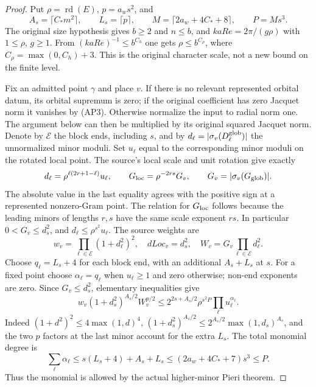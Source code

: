 \begin{proof}
Put \(\rho=\operatorname{rd}(E)\), \(p=a_ws^2\), and
\[
       A_s=\lceil C_*m^2\rceil,\qquad L_s=\lceil p\rceil,
       \qquad M=\lceil 2a_w+4C_*+8\rceil,\qquad P=M s^3 .
\]
The original size hypothesis gives \(b\ge2\) and
\(n\le b\), and \(kaRe=2\pi/(g\rho)\) with
\(1\le\rho\), \(g\ge1\). From \((kaRe)^{-1}\le b^{C_h}\)
one gets
\(\rho\le b^{C_\rho}\), where
\(C_\rho=\max(0,C_h)+3\).
This is the original character scale, not a new
bound on the finite level.

Fix an admitted point \(\gamma\) and place \(v\).
If there is no relevant represented orbital datum,
its orbital supremum is zero; if the original
coefficient has zero Jacquet norm it vanishes by
(AP3). Otherwise normalize the input to radial
norm one. The argument below can then be multiplied
by its original squared Jacquet norm. Denote by
\(\mathcal E\) the block ends, including \(s\), and by
\(d_\ell=|\sigma_v(D_\ell^{\rm glob})|\) the
unnormalized minor moduli. Set \(u_\ell\) equal to
the corresponding minor moduli on the rotated
local point. The source's local scale and unit
rotation give exactly
\[
 d_\ell=\rho^{\ell(2r+1-\ell)}u_\ell,\qquad
 G_{\rm loc}=\rho^{-2rs}G_v,\qquad
 G_v=|\sigma_v(G_{\rm glob})| .
\]
The absolute value in the last equality agrees
with the positive sign at a represented nonzero-Gram
point. The relation for \(G_{\rm loc}\) follows
because the leading minors of lengths \(r,s\)
have the same scale exponent \(rs\).
In particular \(0<G_v\le d_s^2\), and
\(d_\ell\le\rho^{s^2}u_\ell\).
The source weights are
\[
 w_v=\prod_{\ell\in\mathcal E}(1+d_\ell^2)^2,\quad
 dLoc_v=d_s^2,\quad W_v=G_v\prod_{\ell\in\mathcal E}d_\ell^2 .
\]
Choose \(q_\ell=L_s+4\) for each block end, with
an additional \(A_s+L_s\) at \(s\).
For a fixed point choose
\(\alpha_\ell=q_\ell\) when \(u_\ell\ge1\)
and zero otherwise; non-end exponents are zero.
Since \(G_v\le d_s^2\), elementary inequalities give
\[
 w_v(1+d_s^2)^{A_s/2}W_v^{p/2}
       \le 2^{2s+A_s/2}\rho^{s^2P}
                    \prod_\ell u_\ell^{\alpha_\ell}.    \tag{AP8}
\]
Indeed \((1+d^2)^2\le4\max(1,d)^4\),
\((1+d_s^2)^{A_s/2}\le2^{A_s/2}\max(1,d_s)^{A_s}\),
and the two \(p\) factors at the last minor account
for the extra \(L_s\). The total monomial degree is
\[
 \sum_\ell\alpha_\ell
 \le s(L_s+4)+A_s+L_s
 \le (2a_w+4C_*+7)s^3\le P.
\]
Thus the monomial is allowed by the actual higher-minor
Pieri theorem.


\end{proof}
